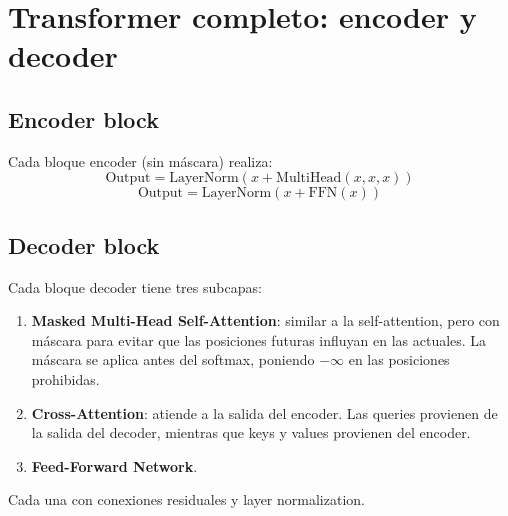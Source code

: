 \documentclass[12pt,a4paper,openany,oneside]{book}
\begin{document}
\section{Transformer completo: encoder y decoder}

\subsection{Encoder block}
Cada bloque encoder (sin máscara) realiza:
\[
\text{Output} = \text{LayerNorm}(x + \text{MultiHead}(x, x, x))
\]
\[
\text{Output} = \text{LayerNorm}(x + \text{FFN}(x))
\]

\subsection{Decoder block}
Cada bloque decoder tiene tres subcapas:
\begin{enumerate}
    \item \textbf{Masked Multi-Head Self-Attention}: similar a la self-attention, pero con máscara para evitar que las posiciones futuras influyan en las actuales. La máscara se aplica antes del softmax, poniendo \(-\infty\) en las posiciones prohibidas.
    \item \textbf{Cross-Attention}: atiende a la salida del encoder. Las queries provienen de la salida del decoder, mientras que keys y values provienen del encoder.
    \item \textbf{Feed-Forward Network}.
\end{enumerate}
Cada una con conexiones residuales y layer normalization.

\begin{center}
\caption{Flujo de información en un bloque decoder.}
\end{center}
\end{document}
